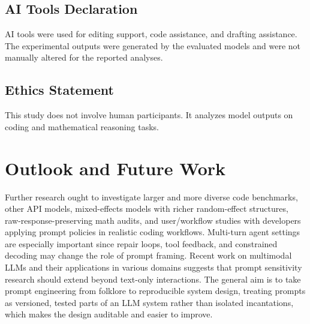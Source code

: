 \subsection{AI Tools Declaration}
AI tools were used for editing support, code assistance, and drafting assistance. The experimental outputs were generated by the evaluated models and were not manually altered for the reported analyses.

\subsection{Ethics Statement}
This study does not involve human participants. It analyzes model outputs on coding and mathematical reasoning tasks.

\section{Outlook and Future Work\label{sec:outlook}}

Further research ought to investigate larger and more diverse code benchmarks, other API models, mixed-effects models with richer random-effect structures, raw-response-preserving math audits, and user/workflow studies with developers applying prompt policies in realistic coding workflows. Multi-turn agent settings are especially important since repair loops, tool feedback, and constrained decoding may change the role of prompt framing. Recent work on multimodal LLMs \cite{yin2024multimodal} and their applications in various domains \cite{zhang2025cybersecurity} suggests that prompt sensitivity research should extend beyond text-only interactions. The general aim is to take prompt engineering from folklore to reproducible system design, treating prompts as versioned, tested parts of an LLM system rather than isolated incantations, which makes the design auditable and easier to improve.
